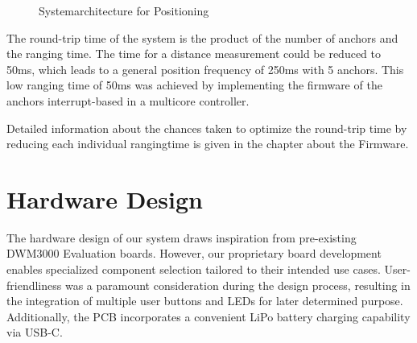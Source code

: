 \documentclass[10pt,a4paper,twocolumn]{article}
\begin{document}
\begin{figure}[H]
  \centering
  \caption{Systemarchitecture for Positioning}
  \label{fig:systemarch}
\end{figure}

The round-trip time of the system is the product of the number of anchors and the ranging time.
The time for a distance measurement could be reduced to 50ms, which leads to a general position frequency of 250ms with 5 anchors.
This low ranging time of 50ms was achieved by implementing the firmware of the anchors interrupt-based in a multicore controller.

Detailed information about the chances taken to optimize the round-trip time by reducing each individual rangingtime
is given in the chapter about the Firmware.

\section{Hardware Design}\label{section:hardware}
The hardware design of our system draws inspiration from pre-existing DWM3000 Evaluation
boards.
However, our proprietary board development enables specialized component selection
tailored to their intended use cases.
User-friendliness was a paramount consideration during the design process,
resulting in the integration of multiple user buttons and LEDs for later determined purpose.
Additionally, the PCB incorporates a convenient LiPo battery charging capability
via USB-C.
\end{document}
